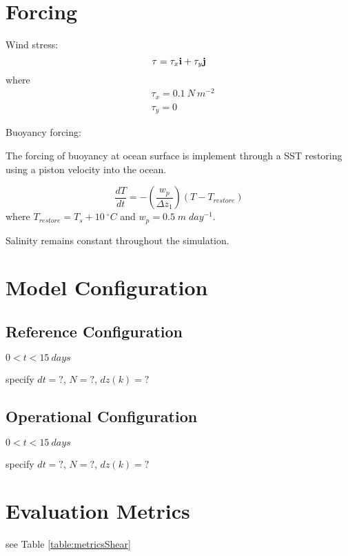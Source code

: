 \documentclass[fleqn, 12pt]{report}
\begin{document}
\section{Forcing}

Wind stress:
\begin{equation*}
{\bf \tau} = \tau_x {\bf i} + \tau_y {\bf j} \\
\end{equation*}
where
\begin{align*}
&\tau_x= 0.1 \ N \ m^{-2} \\
&\tau_y=0
\end{align*}

Buoyancy forcing:

The forcing of buoyancy at ocean surface is implement through a SST restoring using a piston velocity into the ocean.

\begin{equation}
\frac{d T}{dt} = - \left( \frac{w_p}{\Delta z_1} \right) \left(T - T_{restore} \right)
\end{equation}
where $T_{restore}=T_s+10\ ^{\circ}C$ and $w_p = 0.5 \;m\;day^{-1}$.

Salinity remains constant throughout the simulation.

\section{Model Configuration}
\subsection{Reference Configuration}
 $0<t<15 \ days$
 
 specify $dt=?$, $N=?$, $dz(k)=?$

\subsection{Operational Configuration}
 $0<t<15 \ days$
 
 specify $dt=?$, $N=?$, $dz(k)=?$

\section{Evaluation Metrics}
see Table \ref{table:metricsShear}
\end{document}
